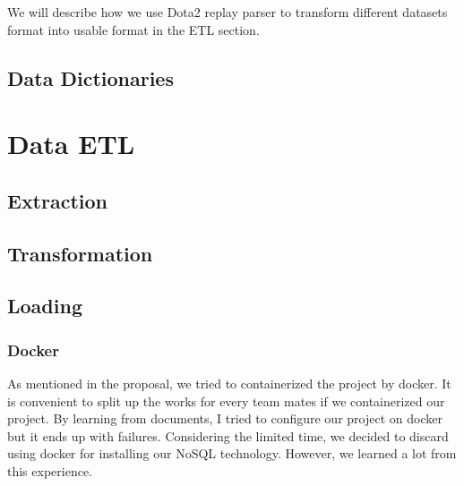 \documentclass{article}
\begin{document}
We will describe how we use Dota2 replay parser to transform different datasets format into usable format in the ETL section.

\subsection{Data Dictionaries}

\section{Data ETL}

\subsection{Extraction}

\subsection{Transformation}

\subsection{Loading}

\subsubsection{Docker}

As mentioned in the proposal, we tried to containerized the project by docker. It is convenient to split up the works for every team mates if we containerized our project. By learning from documents, I tried to configure our project on docker but it ends up with failures. Considering the limited time, we decided to discard using docker for installing our NoSQL technology. However, we learned a lot from this experience.
\end{document}
